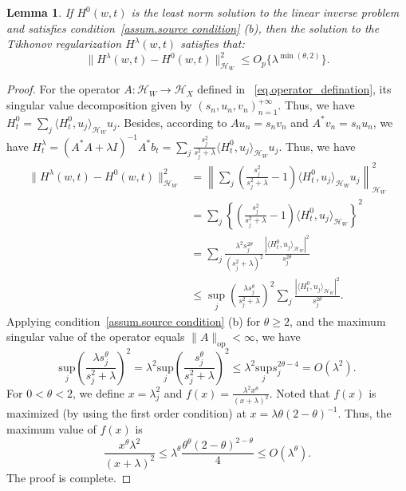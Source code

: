 \documentclass[
  12pt]{article}
\newtheorem{lemma}{Lemma}
\def\to{\rightarrow}
\def\cH{\mathcal{H}}
\begin{document}
\begin{lemma}\label{lem.H_laambda-H_0}
If $H^0(w,t)$ is the least norm solution to the linear inverse problem and satisfies condition~\ref{assum.source condition} (b), then the solution to the Tikhonov regularization $H^\lambda(w,t)$ satisfies that:
$$
\|H^\lambda(w,t)-H^0(w,t)\|^2_{\mathcal{H}_W}\leq O_p\{\lambda^{\min(\theta,2)}\}.
$$
\end{lemma}
\begin{proof}
For the operator $A:\cH_W\to\cH_X$ defined in ~\eqref{eq.operator_defination}, its singular value decomposition given by $(s_n,u_n,v_n)_{n=1}^{+\infty}$. Thus, we have $H^0_t=\sum_{j}\langle H^0_t,u_j\rangle_{\cH_W}u_j$. Besides, according to $Au_n=s_nv_n$ and $A^*v_n=s_nu_n$, we have $H^{\lambda}_t=( A^*A+\lambda I)^{-1}A^*b_t=\sum_{j}\frac{s^2_j}{s^2_j+\lambda}\langle H^0_t,u_j\rangle_{\cH_W}u_j$. Thus, we have
\begin{align*}
	\| H^{\lambda}(w,t)-H^0(w,t)\|_{\mathcal{H}_W}^{2}&=\left\| \sum_j{\left( \frac{s_j^2}{s_j^2+\lambda}-1 \right) \langle H_{t}^{0},u_j\rangle_{\mathcal{H}_W}u_j} \right\|_{\mathcal{H}_W}^{2}\\
	&=\sum_j{\left\{ \left( \frac{s_j^2}{s_j^2+\lambda}-1 \right) \langle H_{t}^{0},u_j\rangle_{\mathcal{H}_W} \right\}^2}\\
	&=\sum_j{\frac{\lambda^2s_{j}^{2\theta}}{( s_j^2+\lambda)^2}\frac{| \langle H_{t}^{0},u_j\rangle_{\mathcal{H}_W}|^2}{s_{j}^{2\theta}}}\\
	&\le \underset{j}{\sup}\left( \frac{\lambda s_{j}^{\theta}}{s_j^2+\lambda} \right)^2\sum_j{\frac{| \langle H_{t}^{0},u_j\rangle_{\mathcal{H}_W}|^2}{s_{j}^{2\theta}}}.
\end{align*}
Applying condition~\ref{assum.source condition} (b) for $\theta \ge 2$,  and the maximum singular value of the operator equals $\|A\|_{\mathrm{op}}<\infty$, we have 
$$
\underset{j}{\mathrm{sup}}\left( \frac{\lambda s_{j}^{\theta}}{s_j^2+\lambda} \right)^2=\lambda^2\underset{j}{\mathrm{sup}}\left( \frac{s_{j}^{\theta}}{s_j^2+\lambda} \right)^2\le \lambda^2\underset{j}{\mathrm{sup}}s_{j}^{2\theta-4} =  O(\lambda^2).
$$
For $0<\theta<2$, we define $x=\lambda_j^2$ and $f(x) =\frac{\lambda^2x^{\theta}}{( x+\lambda)^2}$. Noted that $f(x)$ is maximized (by using the first order condition) at $x=\lambda\theta(2-\theta)^{-1}$. Thus, the maximum value of $f(x)$ is
$$
\frac{x^{\theta}\lambda^2}{(x+\lambda )^2}\le \lambda^{\theta}\frac{\theta^{\theta}(2-\theta )^{2-\theta}}{4}\le O( \lambda^{\theta}). 
$$
The proof is complete.
\end{proof}
\end{document}
